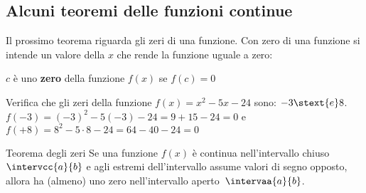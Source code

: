 % 
% 
% 

\subsection{Alcuni teoremi delle funzioni continue}
\label{subsec:cont_iperinteri}

Il prossimo teorema riguarda gli zeri di una funzione. Con zero di una 
funzione 
si intende un valore della \(x\) che rende la funzione uguale a zero:

\begin{newdef}{}{}
 \(c\) è uno \textbf{zero} della funzione \(f(x)\) se \(f(c)=0\)
\end{newdef}

\begin{esempio}
Verifica che gli zeri della funzione \(f(x) = x^2 -5x -24\) \quad sono: 
\(-3 \stext{e} 8\).\\ [.5em]
\(f(-3) = (-3)^2 -5 (-3) -24 = 9 +15 -24 = 0\) \quad e \quad 
\(f(+8) = 8^2 -5 \cdot 8 -24 = 64 -40 -24 = 0\)
\end{esempio}


\begin{newtheo}{Teorema degli zeri}{}
Se una funzione \(f(x)\) è continua nell'intervallo chiuso
\(\intervcc{a}{b}\) e agli estremi dell'intervallo assume valori di segno 
opposto, allora ha (almeno) uno zero nell'intervallo 
aperto~\(\intervaa{a}{b}\).
\end{newtheo}


